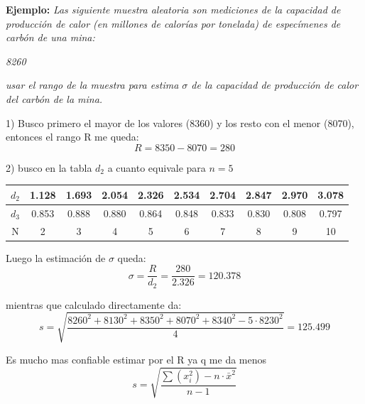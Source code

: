 \documentclass[10pt,a4paper]{article}
\begin{document}
\textbf{Ejemplo:} \textit{Las siguiente muestra aleatoria son mediciones de la capacidad de producción de calor (en millones de calorías por tonelada) de especímenes de carbón de una mina:}

\begin{center}
\textit{8260    }
\end{center}

\textit{usar el rango de la muestra para estima $\sigma$ de la capacidad de producción de calor del carbón de la mina.}

\vspace{4pt}

1) Busco primero el mayor de los valores (8360) y los resto con el menor (8070), entonces el rango R me queda:
\[
R = 8350 - 8070 = 280
\]

2) busco en la tabla $d_2$ a cuanto equivale para $n=5$

\begin{center}
\begin{tabular}{|c|c|c|c|c|c|c|c|c|c|}
\hline
$d_2$ & 1.128 & 1.693 & 2.054 & 2.326 & 2.534 & 2.704 & 2.847 & 2.970 & 3.078 \\
\hline
$d_3$ & 0.853 & 0.888 & 0.880 & 0.864 & 0.848 & 0.833 & 0.830 & 0.808 & 0.797 \\
\hline
N & 2 & 3 & 4 & 5 & 6 & 7 & 8 & 9 & 10 \\
\hline
\end{tabular}
\end{center}

Luego la estimación de $\sigma$ queda:
\[
\sigma = \frac{R}{d_2} = \frac{280}{2.326} = 120.378
\]

mientras que calculado directamente da:
\[
s = \sqrt{\frac{8260^2 + 8130^2 + 8350^2 + 8070^2 + 8340^2 - 5\cdot 8230^2}{4}} = 125.499
\]

Es mucho mas confiable estimar por el R ya q me da menos
\[
s = \sqrt{\frac{\sum (x_i^2) - n\cdot \bar{x}^2}{n-1}}
\]
\end{document}
